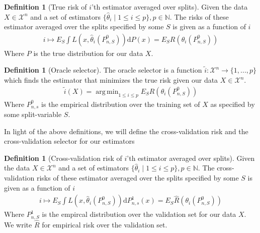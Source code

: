 \documentclass[11pt, a4paper]{article}
\DeclareMathOperator*{\argmin}{arg\,min}
\theoremstyle{definition}
\newtheorem{definition}[theorem]{Definition}
\theoremstyle{remark}
\begin{document}
\begin{definition}[True risk of $ i $'th estimator averaged over splits]
    Given the data $ X \in \mathcal{X}^{n} $ and a set of estimators $ \{ \hat{\theta}_{i} \mid 1 \leq i \leq p \}, p \in \mathbb{N} $. The risks of these estimator averaged over the splits specified by some $ S $ is given as a function of $ i $ 
    \begin{align*}
        i \mapsto E_S \int L(x, \hat{\theta}_{i}(P_{n,S}^{0}) ) \mathrm{d}P(x) = E_S R(\theta_i(P_{n,S}^{0})) 
    \end{align*}
    Where $ P $ is the true distribution for our data $ X $.
\end{definition}

\begin{definition}[Oracle selector]
    The oracle selector is a function $ \tilde{i}: \mathcal{X}^{n} \to \{1,...,p\} $  which finds the estimator that minimizes the true risk given our data $ X \in \mathcal{X}^{n}$. 
    \begin{align*}
        \tilde{i}(X) = \argmin_{1 \leq i \leq p} E_S R(\theta_i (P_{n,S}^0 )) 
    \end{align*}
    Where $ P_{n ,s}^{0} $ is the empirical distribution over the training set of $ X $ as specified by some split-variable $ S $. 
\end{definition}
In light of the above definitions, we will define the cross-validation risk and the cross-validation selector for our estimators

\begin{definition}[Cross-validation risk of $ i $'th estimator averaged over splits]
    Given the data $ X \in \mathcal{X}^{n} $ and a set of estimators $ \{ \hat{\theta}_{i} \mid 1 \leq i \leq p \}, p \in \mathbb{N} $. The cross-validation risks of these estimator averaged over the splits specified by some $ S $ is given as a function of $ i $ 
    \begin{align*}
        i \mapsto E_S \int L(x, \hat{\theta}_{i}(P_{n,S}^{0}) ) \mathrm{d}P_{n, s}^{1}(x) = E_S \hat{R}(\theta_i(P_{n,S}^{0})) 
    \end{align*}
    Where $ P_{n,S}^{1} $ is the empircal distribution over the validation set for our data $ X $. We write $ \hat{R} $ for empirical risk over the validation set. 
\end{definition}
\end{document}
